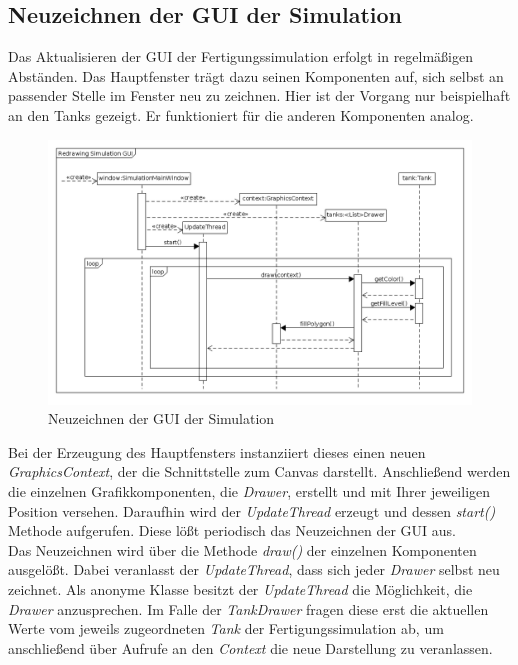 \documentclass[parskip=full]{scrartcl}
\begin{document}
\subsection{Neuzeichnen der GUI der Simulation}
  Das Aktualisieren der GUI der Fertigungssimulation erfolgt in regelm\"a{\ss}igen Abst\"anden. Das Hauptfenster tr\"agt dazu seinen Komponenten auf,
  sich selbst an passender Stelle im Fenster neu zu zeichnen. Hier ist der Vorgang nur beispielhaft an den Tanks gezeigt. Er funktioniert
  f\"ur die anderen Komponenten analog.
  \begin{figure}[H]
    \centering
    \includegraphics[scale=0.35]{design/sequence-diagrams/simulation-redraw.png}
    \caption{Neuzeichnen der GUI der Simulation}
  \end{figure}
  Bei der Erzeugung des Hauptfensters instanziiert dieses einen neuen \emph{GraphicsContext}, der die Schnittstelle zum Canvas darstellt.
  Anschlie{\ss}end werden die einzelnen Grafikkomponenten, die \emph{Drawer}, erstellt und mit Ihrer jeweiligen Position versehen.
  Daraufhin wird der \emph{UpdateThread} erzeugt und dessen \emph{start()} Methode aufgerufen. Diese l\"o{\ss}t periodisch das
  Neuzeichnen der GUI aus.\\
  Das Neuzeichnen wird \"uber die Methode \emph{draw()} der einzelnen Komponenten ausgel\"o{\ss}t. Dabei veranlasst der \emph{UpdateThread}, dass sich jeder \emph{Drawer}
  selbst neu zeichnet. Als anonyme Klasse besitzt der \emph{UpdateThread} die M\"oglichkeit, die \emph{Drawer} anzusprechen. Im Falle der 
  \emph{TankDrawer} fragen diese erst die aktuellen Werte vom jeweils zugeordneten \emph{Tank} der Fertigungssimulation ab, um anschlie{\ss}end
  \"uber Aufrufe an den \emph{Context} die neue Darstellung zu veranlassen.
\end{document}
